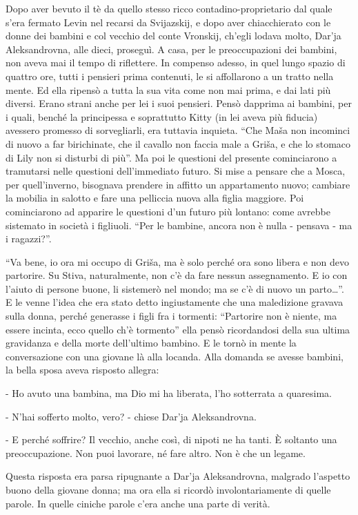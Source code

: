 Dopo aver bevuto il tè da quello stesso ricco contadino-proprietario dal quale s'era fermato Levin nel recarsi da Svijazskij, e dopo aver chiacchierato con le donne dei bambini e col vecchio del conte Vronskij, ch'egli lodava molto, Dar'ja Aleksandrovna, alle dieci, proseguì. A casa, per le preoccupazioni dei bambini, non aveva mai il tempo di riflettere. In compenso adesso, in quel lungo spazio di quattro ore, tutti i pensieri prima contenuti, le si affollarono a un tratto nella mente. Ed ella ripensò a tutta la sua vita come non mai prima, e dai lati più diversi. Erano strani anche per lei i suoi pensieri. Pensò dapprima ai bambini, per i quali, benché la principessa e soprattutto Kitty (in lei aveva più fiducia) avessero promesso di sorvegliarli, era tuttavia inquieta. ``Che Maša non incominci di nuovo a far birichinate, che il cavallo non faccia male a Griša, e che lo stomaco di Lily non si disturbi di più''. Ma poi le questioni del presente cominciarono a tramutarsi nelle questioni dell'immediato futuro. Si mise a pensare che a Mosca, per quell'inverno, bisognava prendere in affitto un appartamento nuovo; cambiare la mobilia in salotto e fare una pelliccia nuova alla figlia maggiore. Poi cominciarono ad apparire le questioni d'un futuro più lontano: come avrebbe sistemato in società i figliuoli. ``Per le bambine, ancora non è nulla - pensava - ma i ragazzi?''. 

``Va bene, io ora mi occupo di Griša, ma è solo perché ora sono libera e non devo partorire. Su Stiva, naturalmente, non c'è da fare nessun assegnamento. E io con l'aiuto di persone buone, li sistemerò nel mondo; ma se c'è di nuovo un parto\ldots{}''. E le venne l'idea che era stato detto ingiustamente che una maledizione gravava sulla donna, perché generasse i figli fra i tormenti: ``Partorire non è niente, ma essere incinta, ecco quello ch'è tormento'' ella pensò ricordandosi della sua ultima gravidanza e della morte dell'ultimo bambino. E le tornò in mente la conversazione con una giovane là alla locanda. Alla domanda se avesse bambini, la bella sposa aveva risposto allegra: 

- Ho avuto una bambina, ma Dio mi ha liberata, l'ho sotterrata a quaresima. 

- N'hai sofferto molto, vero? - chiese Dar'ja Aleksandrovna. 

- E perché soffrire? Il vecchio, anche così, di nipoti ne ha tanti. È soltanto una preoccupazione. Non puoi lavorare, né fare altro. Non è che un legame. 

Questa risposta era parsa ripugnante a Dar'ja Aleksandrovna, malgrado l'aspetto buono della giovane donna; ma ora ella si ricordò involontariamente di quelle parole. In quelle ciniche parole c'era anche una parte di verità. 

